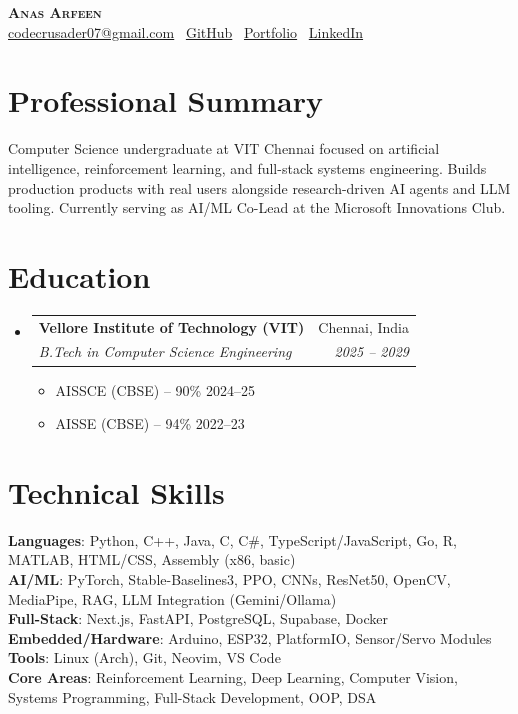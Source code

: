 \documentclass[letterpaper,11pt]{article}
\makeatletter
\newcommand{\resumeItem}[1]{
  \item\small{
    {#1 \vspace{-2pt}}
  }
}
\newcommand{\resumeSubheading}[4]{
  \vspace{-2pt}\item
  \begin{minipage}[t]{0.97\textwidth}
    \begin{tabular*}{\linewidth}[t]{l@{\extracolsep{\fill}}r}
      \textbf{#1} & #2 \\
      \textit{\small#3} & \textit{\small #4} \\
    \end{tabular*}\vspace{-7pt}
}
\newcommand{\resumeSubHeadingListStart}{\begin{itemize}[leftmargin=0.15in, label={}]}
\newcommand{\resumeSubHeadingListEnd}{\end{itemize}}
\newcommand{\resumeItemListStart}{\begin{itemize}}
\newcommand{\resumeItemListEnd}{\end{itemize}\vspace{-5pt}\end{minipage}}
\makeatother
\begin{document}
\begin{center}
    \textbf{\Huge \scshape Anas Arfeen} \\ \vspace{1pt}
    \small
    \href{mailto:codecrusader07@gmail.com}{codecrusader07@gmail.com}
    \textbar\
    \href{https://github.com/Anasarfeen123}{GitHub}
    \textbar\
    \href{https://anasarfeen.dev}{Portfolio}
    \textbar\
    \href{https://www.linkedin.com/in/anas-arfeen-b94870366/}{LinkedIn}
\end{center}

\section{Professional Summary}
\small{Computer Science undergraduate at VIT Chennai focused on artificial intelligence, reinforcement learning, and full-stack systems engineering. Builds production products with real users alongside research-driven AI agents and LLM tooling. Currently serving as AI/ML Co-Lead at the Microsoft Innovations Club.}

\section{Education}
  \resumeSubHeadingListStart
    \resumeSubheading
      {Vellore Institute of Technology (VIT)}{Chennai, India}
      {B.Tech in Computer Science Engineering}{2025 -- 2029}
      \resumeItemListStart
        \resumeItem{AISSCE (CBSE) -- 90\% \hfill 2024--25}
        \resumeItem{AISSE (CBSE) -- 94\% \hfill 2022--23}
      \resumeItemListEnd
  \resumeSubHeadingListEnd

\section{Technical Skills}
 \begin{itemize}[leftmargin=0.15in, label={}]
    \small{\item{
     \textbf{Languages}{: Python, C++, Java, C, C\#, TypeScript/JavaScript, Go, R, MATLAB, HTML/CSS, Assembly (x86, basic)} \\
     \textbf{AI/ML}{: PyTorch, Stable-Baselines3, PPO, CNNs, ResNet50, OpenCV, MediaPipe, RAG, LLM Integration (Gemini/Ollama)} \\
     \textbf{Full-Stack}{: Next.js, FastAPI, PostgreSQL, Supabase, Docker} \\
     \textbf{Embedded/Hardware}{: Arduino, ESP32, PlatformIO, Sensor/Servo Modules} \\
     \textbf{Tools}{: Linux (Arch), Git, Neovim, VS Code} \\
     \textbf{Core Areas}{: Reinforcement Learning, Deep Learning, Computer Vision, Systems Programming, Full-Stack Development, OOP, DSA}
    }}
 \end{itemize}
\end{document}
